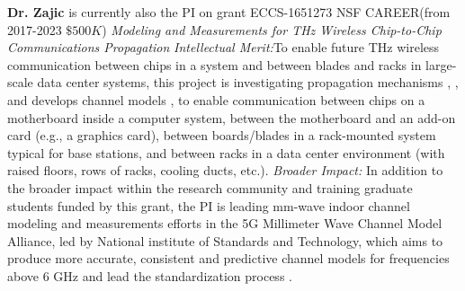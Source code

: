 \documentclass[11 pt]{article}
\begin{document}
{\bf Dr. Zajic} is currently also the PI on grant ECCS-1651273 NSF CAREER(from 2017-2023 $\$500K$) \textit{Modeling and Measurements for THz Wireless Chip-to-Chip Communications Propagation} \textit{Intellectual Merit:}To enable future THz wireless communication between chips in a system and between blades and racks in large-scale data center systems, this project is investigating  propagation mechanisms \cite{Cheng2020}, \cite{Kim2016}, \cite{Fu2019} and develops channel models \cite{Kim2016a}, \cite{Fu2020} to enable communication between chips on a motherboard inside a computer system, between the motherboard and an add-on card (e.g., a graphics card), between boards/blades in a rack-mounted system typical for base stations, and between racks in a data center environment (with raised floors, rows of racks, cooling ducts, etc.). \textit{Broader Impact:} In addition to the broader impact within the research community and training graduate students funded by this grant, the PI is leading mm-wave indoor channel modeling and measurements efforts in the 5G Millimeter Wave Channel Model Alliance, led by National institute of Standards and Technology, which aims to produce more accurate, consistent and predictive channel models for frequencies above 6 GHz and lead the standardization process \cite{Book}.





\end{document}
